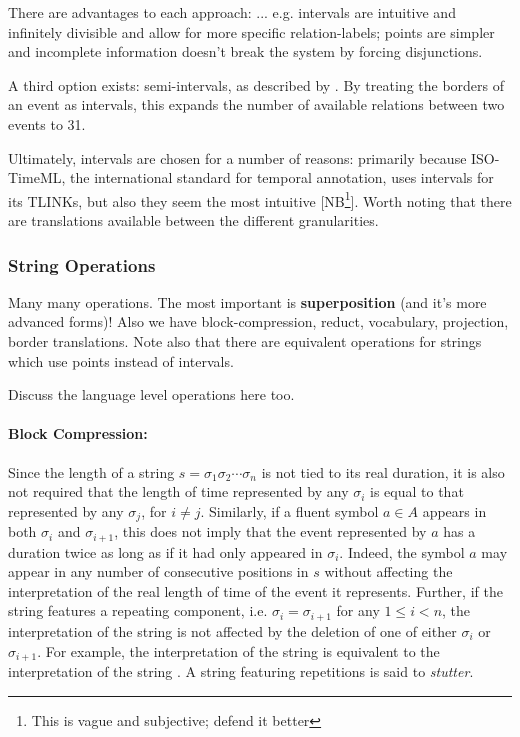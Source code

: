 \documentclass[a4paper,12pt,leqno]{article}
\newcommand{\vph}[1]{\vphantom{#1}}
\newcommand{\ebox}[1]{\fbox{$\vph{'(),}#1$}}
\newcommand{\EventString}[1]{
	\renewcommand*{\do}[1]{\ebox{##1}}%
	\PipeParser{#1}
}
\newcommand{\selfnote}[1]{{\color{red}[NB\footnote{{\color{red}#1}}]}}
\begin{document}
There are advantages to each approach: ... e.g. intervals are intuitive and infinitely divisible and allow for more specific relation-labels; points are simpler and incomplete information doesn't break the system by forcing disjunctions.

A third option exists: semi-intervals, as described by \cite{Freksa1992}. By treating the borders of an event as intervals, this expands the number of available relations between two events to 31.

Ultimately, intervals are chosen for a number of reasons: primarily because ISO-TimeML, the international standard for temporal annotation, uses intervals for its TLINKs, but also they seem the most intuitive \selfnote{This is vague and subjective; defend it better}. Worth noting that there are translations available between the different granularities.

\subsubsection{String Operations}\label{ssub:operations}
Many many operations. The most important is \textbf{superposition} (and it's more advanced forms)! Also we have block-compression, reduct, vocabulary, projection, border translations. Note also that there are equivalent operations for strings which use points instead of intervals.

{\color{red} Discuss the language level operations here too.}

\paragraph{Block Compression:}
Since the length of a string $s = \sigma_1\sigma_2\cdots\sigma_n$ is not tied to its real duration, it is also not required that the length of time represented by any $\sigma_i$ is equal to that represented by any $\sigma_j$, for $i \neq j$. Similarly, if a fluent symbol $a \in A$ appears in both $\sigma_i$ and $\sigma_{i+1}$, this does not imply that the event represented by $a$ has a duration twice as long as if it had only appeared in $\sigma_i$. Indeed, the symbol $a$ may appear in any number of consecutive positions in $s$ without affecting the interpretation of the real length of time of the event it represents. Further, if the string features a repeating component, i.e. $\sigma_i = \sigma_{i+1}$ for any $1 \le i < n$, the interpretation of the string is not affected by the deletion of one of either $\sigma_i$ or $\sigma_{i+1}$. For example, the interpretation of the string \EventString{a|a|a,b|b|b} is equivalent to the interpretation of the string \EventString{a|a,b|b}. A string featuring repetitions is said to \textit{stutter}.
\end{document}
